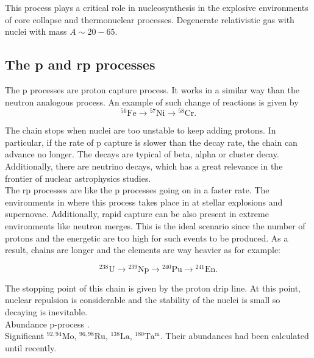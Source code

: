 \documentclass[openany]{book}
\begin{document}
This process plays a critical role in nucleosynthesis in the explosive environments of core collapse and thermonuclear processes. Degenerate relativistic gas with nuclei with mass $A \sim 20-65$. 

\subsection{The p and rp processes} \label{sub:pProcesses}

The p processes are proton capture process. It works in a similar way than the neutron analogous process. An example of such change of reactions is given by \\

\begin{equation}\label{eq:reactions_pProcess}
	\mathrm{{}^{56}Fe \rightarrow {}^{57}Ni \rightarrow  {}^{58}Cr }.
\end{equation}

The chain stops when nuclei are too unstable to keep adding protons. In particular, if the rate of p capture is slower than the decay rate, the chain can advance no longer. The decays are typical of beta, alpha or cluster decay. Additionally, there are neutrino decays, which has a great relevance in the frontier of nuclear astrophysics studies. \\

The rp processes are like the p processes going on in a faster rate. The environments in where this process takes place in at stellar explosions and supernovae. Additionally, rapid capture can be also present in extreme environments like neutron merges. This is the ideal scenario since the number of protons and the energetic are too high for such events to be produced. As a result, chains are longer and the elements are way heavier as for example:

\begin{equation}\label{eq:reactions_rpProcess}
	\mathrm{{}^{238}U \rightarrow {}^{239}Np \rightarrow  {}^{240}Pu \rightarrow  {}^{241}En }.
	\end{equation}

The stopping point of this chain is given by the proton drip line. At this point, nuclear repulsion is  considerable and the stability of the nuclei is small so decaying is inevitable.   \\
		
Abundance p-process \cite{delaeter_2008}. \\

Significant $\mathrm{{}^{92, 94}Mo}$, $\mathrm{{}^{96, 98}Ru}$, $\mathrm{{}^{138}La}$,  $\mathrm{{}^{180}Ta^{m}}$. 
Their abundances had been calculated until recently. \\
	
\end{document}
